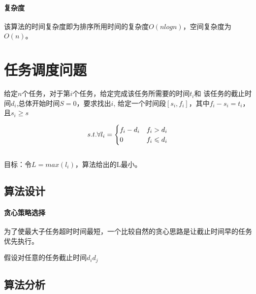 \paragraph*{复杂度}
该算法的时间复杂度即为排序所用时间的复杂度$O(nlogn)$，空间复杂度为$O(n)$。

\section{任务调度问题}
\begin{example}
	给定$n$个任务，对于第$i$个任务，给定完成该任务所需要的时间$t_i$和
	该任务的截止时间$d_i$,总体开始时间$S=0$，要求找出$i$,
	给定一个时间段$[s_i,f_i]$，其中$f_i - s_i = t_i$，且$s_i\geqslant s$

	\begin{equation}
		s.t. \forall \space l_i = \begin{cases}
			f_i - d_i & f_i > d_i    \\
			0        & f_i \leqslant d_i
		\end{cases}
	\end{equation}
	\\目标：令$L=max(l_i)$，算法给出的L最小。
\end{example}

\subsection{算法设计}
\paragraph*{贪心策略选择}
为了使最大子任务超时时间最短，一个比较自然的贪心思路是让截止时间早的任务优先执行。

\begin{remark}
    假设对任意的任务截止时间$d_i$\neq$d_j$
\end{remark}

\subsection{算法分析}

